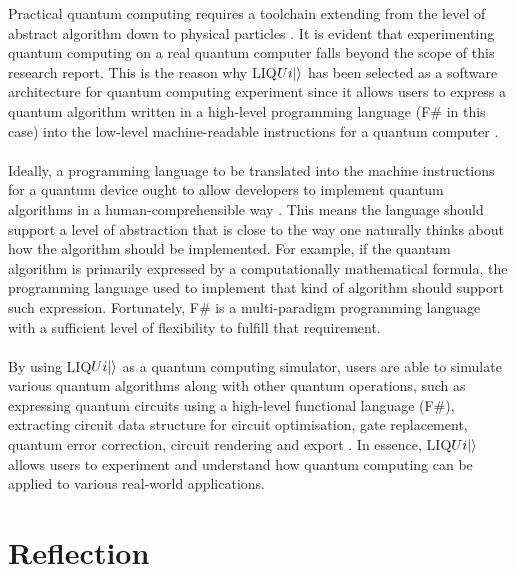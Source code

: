 \documentclass[12pt]{third-rep}
\begin{document}
\noindent Practical quantum computing requires a toolchain extending from the level of abstract algorithm down to physical particles \cite{acm}. It is evident that experimenting quantum computing on a real quantum computer falls beyond the scope of this research report. This is the reason why LIQ$Ui{\left\vert{}\right\rangle}$ has been selected as a software architecture for quantum computing experiment since it allows users to express a quantum algorithm written in a high-level programming language (F\# in this case) into the low-level machine-readable instructions for a quantum computer \cite{liquid-overview}. \\\\
Ideally, a programming language to be translated into the machine instructions for a quantum device ought to allow developers to implement quantum algorithms in a human-comprehensible way \cite{acm}. This means the language should support a level of abstraction that is close to the way one naturally thinks about how the algorithm should be implemented. For example, if the quantum algorithm is primarily expressed by a computationally mathematical formula, the programming language used to implement that kind of algorithm should support such expression. Fortunately, F\# is a multi-paradigm programming language with a sufficient level of flexibility to fulfill that requirement. \\\\
By using LIQ$Ui{\left\vert{}\right\rangle}$ as a quantum computing simulator, users are able to simulate various quantum algorithms along with other quantum operations, such as expressing quantum circuits using a high-level functional language (F\#), extracting circuit data structure for circuit optimisation, gate replacement, quantum error correction, circuit rendering and export \cite{liquid-overview}. In essence, LIQ$Ui{\left\vert{}\right\rangle}$ allows users to experiment and understand how quantum computing can be applied to various real-world applications.

\begingroup
\renewcommand{\cleardoublepage}{}
\renewcommand{\clearpage}{}
\chapter{Reflection}
\endgroup
\end{document}
